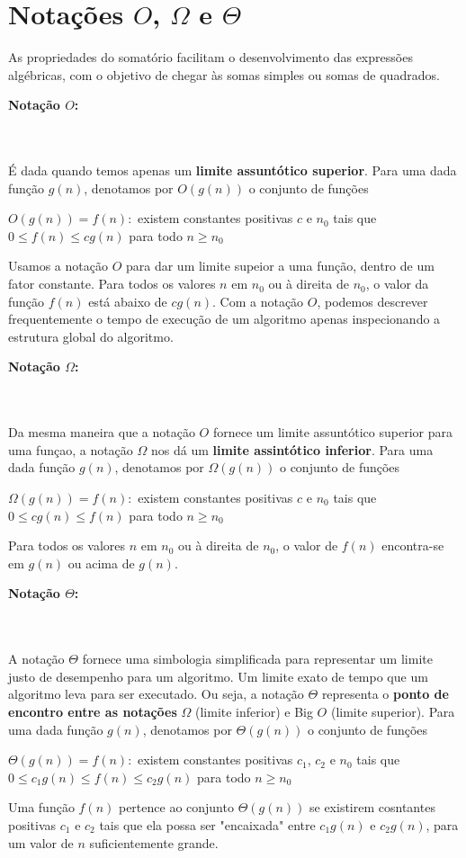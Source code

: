 \documentclass[a4paper, 12pt, fleqn, leqno]{article}
\begin{document}
\section{Notações ${O}$, $\Omega$ e $\Theta$}
		As propriedades do somatório facilitam o desenvolvimento das expressões algébricas, com o objetivo de chegar às somas simples ou somas de quadrados.
			\begin{itemize}
				{\item \bf Notação ${O}$:} \\\\
				É dada quando temos apenas um {\bf limite assuntótico superior}. Para uma dada função $g(n)$, denotamos por ${O}(g(n))$ o conjunto de funções
				\begin{center}
					${O}(g(n)) = f(n):$ existem constantes positivas $c$ e $n_{0}$ tais que $0 \leq f(n) \leq cg(n)$ para todo $n \geq n_{0}$	
				\end{center}
				Usamos a notação ${O}$ para dar um limite supeior a uma função, dentro de um fator constante. Para todos os valores $n$ em $n_{0}$ ou à direita de $n_{0}$, o valor da função $f(n)$ está abaixo de $cg(n)$.
				Com a notação ${O}$, podemos descrever frequentemente o tempo de execução de um algoritmo apenas inspecionando a estrutura global do algoritmo.
			    
				{\item \bf Notação $\Omega$:} \\\\
				Da mesma maneira que a notação ${O}$ fornece um  limite assuntótico superior para uma funçao, a notação $\Omega$ nos dá um {\bf limite assintótico inferior}. Para uma dada função $g(n)$, denotamos por $\Omega(g(n))$ o conjunto de funções
				\begin{center}
					$\Omega(g(n)) = f(n):$ existem constantes positivas $c$ e $n_{0}$ tais que $0 \leq cg(n) \leq f(n)$ para todo $n \geq n_{0}$	
				\end{center}
				Para todos os valores $n$ em $n_{0}$ ou à direita de $n_{0}$, o valor de $f(n)$ encontra-se em $g(n)$ ou acima de $g(n)$.
				{\item \bf Notação $\Theta$:} \\\\
				A notação $\Theta$ fornece uma simbologia simplificada para representar um limite justo de desempenho para um algoritmo. Um limite exato de tempo que um algoritmo leva para ser executado. Ou seja, a notação $\Theta$ representa o {\bf ponto de encontro entre as notações} $\Omega$ (limite inferior) e Big ${O}$ (limite superior). Para uma dada função $g(n)$, denotamos por $\Theta(g(n))$ o conjunto de funções
				\begin{center}
					$\Theta(g(n)) = f(n):$ existem constantes positivas $c_{1}$, $c_{2}$ e $n_{0}$ tais que $0 \leq c_{1}g(n) \leq f(n) \leq c_{2}g(n)$ para todo $n \geq n_{0}$	
				\end{center}
				Uma função $f(n)$ pertence ao conjunto $\Theta(g(n))$ se existirem cosntantes positivas $c_{1}$ e $c_{2}$ tais que ela possa ser "encaixada" entre $c_{1}g(n)$ e $c_{2}g(n)$, para um valor de $n$ suficientemente grande.						

			\end{itemize}
\end{document}
